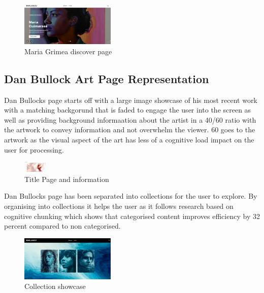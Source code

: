 \documentclass[]{project_final}
\begin{document}
\begin{figure}[ht!]
  \centering
  \includegraphics[width=0.4\textwidth]{AG10.png}
  \vspace*{0.0cm}
  \caption{Maria Grimea discover page}
  \label{fig:1}
\end{figure}

\subsection{Dan Bullock Art Page Representation}
Dan Bullocks page starts off with a large image showcase of his most recent work with a matching backgorund that is faded to engage the user into the screen as well as providing background informaation about the artist in a 40/60 ratio with the artwork to convey information and not overwhelm the viewer. 60 goes to the artwork as the visual aspect of the art has less of a cognitive load impact on the user for processing.

\begin{figure}[H]
  \centering
  \includegraphics[width=0.1\textwidth]{AG11.png}
  \vspace*{0.0cm}
  \caption{Title Page and information}
  \label{fig:1}
\end{figure}

Dan Bullocks page has been separated into collections for the user to explore. By organising into collections it helps the user as it follows research based on cognitive chunking  which shows that categorised content improves efficiency by 32 percent compared to non categorised.

\begin{figure}[ht!]
  \centering
  \includegraphics[width=0.4\textwidth]{AG12.png}
  \vspace*{0.0cm}
  \caption{Collection showcase}
  \label{fig:1}
\end{figure}
\end{document}
